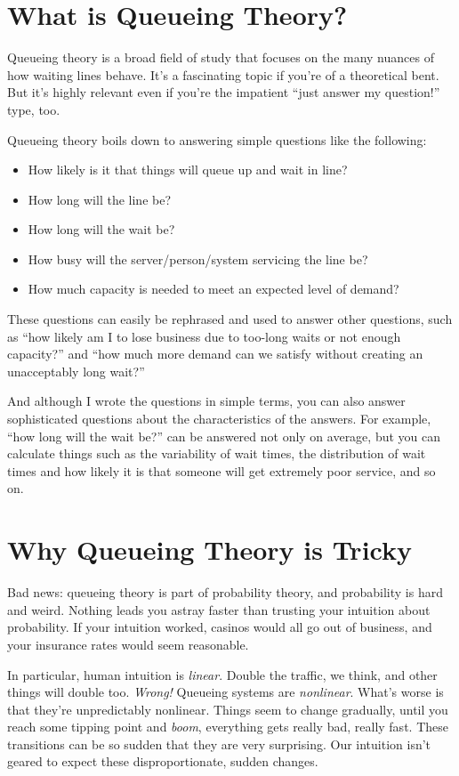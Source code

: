 \documentclass{vivid_layout_pdf}
\begin{document}
\section{What is Queueing Theory?}

Queueing theory is a broad field of study that focuses on the many nuances of how waiting lines behave. It's a fascinating topic if you're of a theoretical bent. But it's highly relevant even if you're the impatient ``just answer my question!'' type, too.

Queueing theory boils down to answering simple questions like the following:

\begin{itemize}
\item How likely is it that things will queue up and wait in line?
\item How long will the line be?
\item How long will the wait be?
\item How busy will the server/person/system servicing the line be?
\item How much capacity is needed to meet an expected level of demand?
\end{itemize}

These questions can easily be rephrased and used to answer other questions, such as ``how likely am I to lose business due to too-long waits or not enough capacity?'' and ``how much more demand can we satisfy without creating an unacceptably long wait?''

And although I wrote the questions in simple terms, you can also answer sophisticated questions about the characteristics of the answers. For example, ``how long will the wait be?'' can be answered not only on average, but you can calculate things such as the variability of wait times, the distribution of wait times and how likely it is that someone will get extremely poor service, and so on.

\section{Why Queueing Theory is Tricky}

Bad news: queueing theory is part of probability theory, and probability is hard and weird. Nothing leads you astray faster than trusting your intuition about probability. If your intuition worked, casinos would all go out of business, and your insurance rates would seem reasonable.

In particular, human intuition is {\itshape linear}. Double the traffic, we think, and other things will double too. {\itshape Wrong!} Queueing systems are {\itshape nonlinear}. What's worse is that they're unpredictably nonlinear. Things seem to change gradually, until you reach some tipping point and {\itshape boom}, everything gets really bad, really fast. These transitions can be so sudden that they are very surprising. Our intuition isn't geared to expect these disproportionate, sudden changes.
\end{document}
